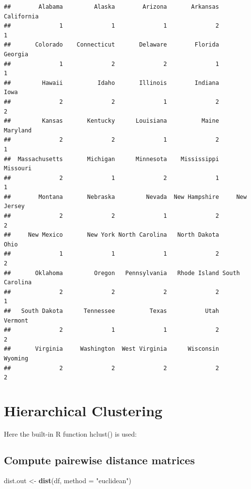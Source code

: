 \documentclass[
]{book}
\newenvironment{Shaded}{\begin{snugshade}}{\end{snugshade}}
\newcommand{\DataTypeTok}[1]{\textcolor[rgb]{0.13,0.29,0.53}{#1}}
\newcommand{\KeywordTok}[1]{\textcolor[rgb]{0.13,0.29,0.53}{\textbf{#1}}}
\newcommand{\NormalTok}[1]{#1}
\newcommand{\StringTok}[1]{\textcolor[rgb]{0.31,0.60,0.02}{#1}}
\begin{document}
\begin{verbatim}
##        Alabama         Alaska        Arizona       Arkansas     California 
##              1              1              1              2              1 
##       Colorado    Connecticut       Delaware        Florida        Georgia 
##              1              2              2              1              1 
##         Hawaii          Idaho       Illinois        Indiana           Iowa 
##              2              2              1              2              2 
##         Kansas       Kentucky      Louisiana          Maine       Maryland 
##              2              2              1              2              1 
##  Massachusetts       Michigan      Minnesota    Mississippi       Missouri 
##              2              1              2              1              1 
##        Montana       Nebraska         Nevada  New Hampshire     New Jersey 
##              2              2              1              2              2 
##     New Mexico       New York North Carolina   North Dakota           Ohio 
##              1              1              1              2              2 
##       Oklahoma         Oregon   Pennsylvania   Rhode Island South Carolina 
##              2              2              2              2              1 
##   South Dakota      Tennessee          Texas           Utah        Vermont 
##              2              1              1              2              2 
##       Virginia     Washington  West Virginia      Wisconsin        Wyoming 
##              2              2              2              2              2
\end{verbatim}

\hypertarget{hierarchical-clustering}{%
\section{Hierarchical Clustering}\label{hierarchical-clustering}}

Here the built-in R function hclust() is used:

\hypertarget{compute-pairewise-distance-matrices}{%
\subsection{Compute pairewise distance matrices}\label{compute-pairewise-distance-matrices}}

\begin{Shaded}
\begin{Highlighting}[]
\NormalTok{dist.out <-}\StringTok{ }\KeywordTok{dist}\NormalTok{(df, }\DataTypeTok{method =} \StringTok{"euclidean"}\NormalTok{)}
\end{Highlighting}
\end{Shaded}
\end{document}
